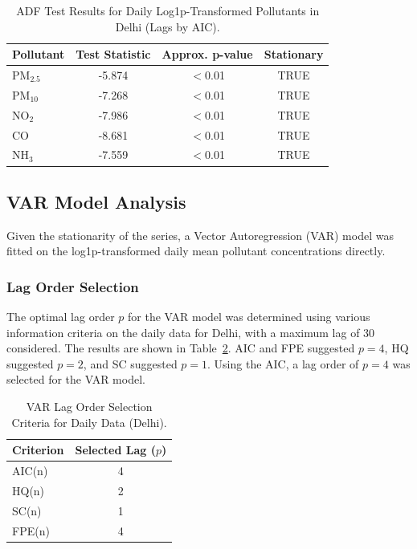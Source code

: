 \documentclass[fleqn,10pt]{SelfArx} %
\begin{document}
\begin{table}[hbt]
\caption{ADF Test Results for Daily Log1p-Transformed Pollutants in Delhi (Lags by AIC).}
\centering
\begin{tabular}{lccc}
\toprule
Pollutant & Test Statistic & Approx. p-value & Stationary \\
\midrule
$\text{PM}_{2.5}$ & -5.874 & $<$0.01 & TRUE \\
$\text{PM}_{10}$  & -7.268 & $<$0.01 & TRUE \\
$\text{NO}_2$    & -7.986 & $<$0.01 & TRUE \\
CO             & -8.681 & $<$0.01 & TRUE \\
$\text{NH}_3$    & -7.559 & $<$0.01 & TRUE \\
\bottomrule
\end{tabular}
\label{tab:adf_results}
\end{table}

\subsection{VAR Model Analysis}
Given the stationarity of the series, a Vector Autoregression (VAR) model was fitted on the log1p-transformed daily mean pollutant concentrations directly.

\subsubsection{Lag Order Selection}
The optimal lag order $p$ for the VAR model was determined using various information criteria on the daily data for Delhi, with a maximum lag of 30 considered. The results are shown in Table~\ref{tab:var_lag_selection}. AIC and FPE suggested $p=4$, HQ suggested $p=2$, and SC suggested $p=1$. Using the AIC, a lag order of $p=4$ was selected for the VAR model.

\begin{table}[hbt]
\caption{VAR Lag Order Selection Criteria for Daily Data (Delhi).}
\centering
\begin{tabular}{lc}
\toprule
Criterion & Selected Lag ($p$) \\
\midrule
AIC(n)    & 4 \\
HQ(n)     & 2 \\
SC(n)     & 1 \\
FPE(n)    & 4 \\
\bottomrule
\end{tabular}
\label{tab:var_lag_selection}
\end{table}
\end{document}
